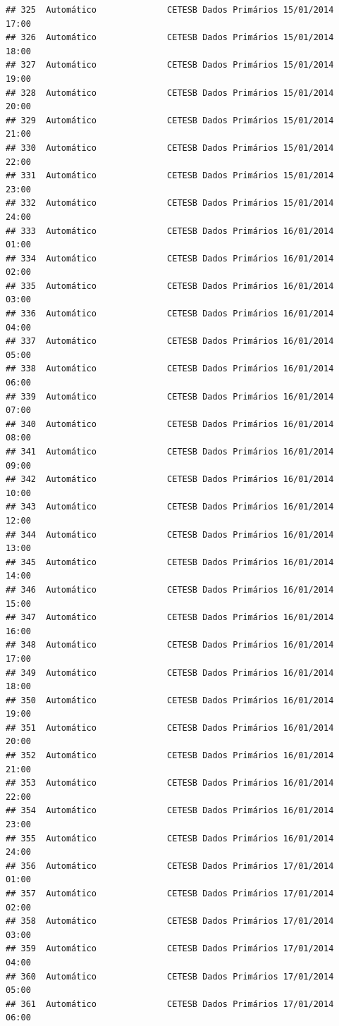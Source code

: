 \documentclass[]{book}
\begin{document}
\begin{verbatim}
## 325  Automático              CETESB Dados Primários 15/01/2014 17:00
## 326  Automático              CETESB Dados Primários 15/01/2014 18:00
## 327  Automático              CETESB Dados Primários 15/01/2014 19:00
## 328  Automático              CETESB Dados Primários 15/01/2014 20:00
## 329  Automático              CETESB Dados Primários 15/01/2014 21:00
## 330  Automático              CETESB Dados Primários 15/01/2014 22:00
## 331  Automático              CETESB Dados Primários 15/01/2014 23:00
## 332  Automático              CETESB Dados Primários 15/01/2014 24:00
## 333  Automático              CETESB Dados Primários 16/01/2014 01:00
## 334  Automático              CETESB Dados Primários 16/01/2014 02:00
## 335  Automático              CETESB Dados Primários 16/01/2014 03:00
## 336  Automático              CETESB Dados Primários 16/01/2014 04:00
## 337  Automático              CETESB Dados Primários 16/01/2014 05:00
## 338  Automático              CETESB Dados Primários 16/01/2014 06:00
## 339  Automático              CETESB Dados Primários 16/01/2014 07:00
## 340  Automático              CETESB Dados Primários 16/01/2014 08:00
## 341  Automático              CETESB Dados Primários 16/01/2014 09:00
## 342  Automático              CETESB Dados Primários 16/01/2014 10:00
## 343  Automático              CETESB Dados Primários 16/01/2014 12:00
## 344  Automático              CETESB Dados Primários 16/01/2014 13:00
## 345  Automático              CETESB Dados Primários 16/01/2014 14:00
## 346  Automático              CETESB Dados Primários 16/01/2014 15:00
## 347  Automático              CETESB Dados Primários 16/01/2014 16:00
## 348  Automático              CETESB Dados Primários 16/01/2014 17:00
## 349  Automático              CETESB Dados Primários 16/01/2014 18:00
## 350  Automático              CETESB Dados Primários 16/01/2014 19:00
## 351  Automático              CETESB Dados Primários 16/01/2014 20:00
## 352  Automático              CETESB Dados Primários 16/01/2014 21:00
## 353  Automático              CETESB Dados Primários 16/01/2014 22:00
## 354  Automático              CETESB Dados Primários 16/01/2014 23:00
## 355  Automático              CETESB Dados Primários 16/01/2014 24:00
## 356  Automático              CETESB Dados Primários 17/01/2014 01:00
## 357  Automático              CETESB Dados Primários 17/01/2014 02:00
## 358  Automático              CETESB Dados Primários 17/01/2014 03:00
## 359  Automático              CETESB Dados Primários 17/01/2014 04:00
## 360  Automático              CETESB Dados Primários 17/01/2014 05:00
## 361  Automático              CETESB Dados Primários 17/01/2014 06:00

\end{verbatim}
\end{document}
